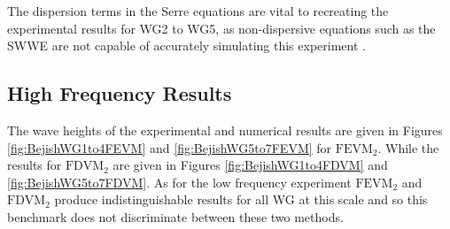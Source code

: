The dispersion terms in the Serre equations are vital to recreating the experimental results for WG2 to WG5, as non-dispersive equations such as the SWWE are not capable of accurately simulating this experiment \cite{Pitt-2017-1725}.

\subsection{High Frequency Results}
The wave heights of the experimental and numerical results are given in Figures \ref{fig:BejishWG1to4FEVM} and \ref{fig:BejishWG5to7FEVM} for $\text{FEVM}_2$. While the results for $\text{FDVM}_2$ are given in Figures \ref{fig:BejishWG1to4FDVM} and \ref{fig:BejishWG5to7FDVM}. As for the low frequency experiment $\text{FEVM}_2$ and $\text{FDVM}_2$ produce indistinguishable results for all WG at this scale and so this benchmark does not discriminate between these two methods. 
%
